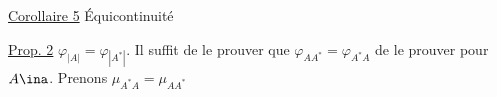 \uline{Corollaire 5} Équicontinuité 

\uline{Prop. 2} $\varphi_{|A|}=\varphi_{|A^*|}$.
Il suffit de le prouver que $\varphi_{AA^*}=\varphi_{A^*A}$
de le prouver pour $A\ina$.
Prenons
$\mu_{A^*A}=\mu_{AA^*}$
